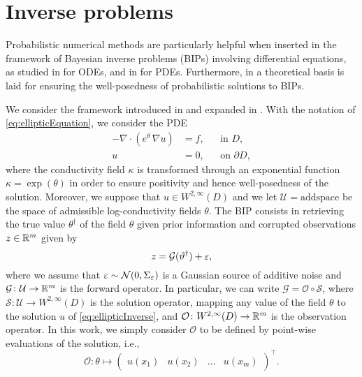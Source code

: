 \section{Inverse problems}\label{sec:inverseproblems}

Probabilistic numerical methods are particularly helpful when inserted in the framework of Bayesian inverse problems (BIPs) involving differential equations, as studied in \cite{AbG20, CGS17} for ODEs, and in \cite{COS17, CCC16} for PDEs. Furthermore, in \cite{LST18} a theoretical basis is laid for ensuring the well-posedness of probabilistic solutions to BIPs.

We consider the framework introduced in \cite{Stu10} and expanded in \cite{DaS11}. With the notation of \eqref{eq:ellipticEquation}, we consider the PDE
\begin{equation}\label{eq:ellipticInverse}
\begin{aligned}
	-\nabla \cdot (e^\theta \, \nabla u) &= f, &&\text{in } D,\\
	u &= 0, &&\text{on } \partial D,
\end{aligned}
\end{equation}
where the conductivity field $\kappa$ is transformed through an exponential function $\kappa = \exp(\theta)$ in order to ensure positivity and hence well-posedness of the solution. Moreover, we suppose that $u \in W^{2, \infty}(D)$ and we let $\mathcal U = \mathrm{add space}$ be the space of admissible log-conductivity fields $\theta$. The BIP consists in retrieving the true value $\theta^\dagger$ of the field $\theta$ given prior information and corrupted observations $z \in \mathbb{R}^m$ given by
\begin{equation}
	z = \mathcal G(\vartheta^\dagger) + \varepsilon,
\end{equation}
where we assume that $\varepsilon \sim \mathcal N(0, \Sigma_\varepsilon)$ is a Gaussian source of additive noise and $\mathcal G \colon \mathcal U \to \mathbb{R}^m$ is the forward operator. In particular, we can write $\mathcal G = \mathcal O \circ \mathcal S$, where $\mathcal S \colon \mathcal U  \to W^{2, \infty}(D)$ is the solution operator, mapping any value of the field $\theta$ to the solution $u$ of \eqref{eq:ellipticInverse}, and $\mathcal O \colon W^{2, \infty}(D) \to \mathbb{R}^m$ is the observation operator. In this work, we simply consider $\mathcal O$ to be defined by point-wise evaluations of the solution, i.e., 
\begin{equation}
\mathcal O\colon \theta \mapsto \begin{pmatrix} u(x_1) & u(x_2) & \ldots & u(x_m) \end{pmatrix}^\top.
\end{equation} 
